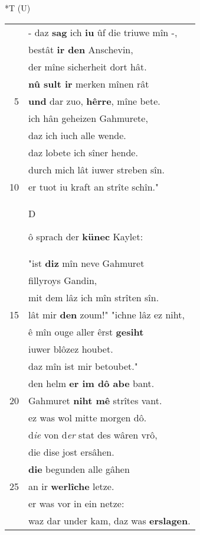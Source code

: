 \documentclass[8pt,a4paper,notitlepage]{article}
\begin{document}
\begin{table}[ht]
\begin{minipage}[t]{0.5\linewidth}
\end{minipage}
\hspace{0.5cm}
\begin{minipage}[t]{0.5\linewidth}
\small
\begin{center}*T (U)
\end{center}
\begin{tabular}{rl}
 & - daz \textbf{sag} ich \textbf{iu} ûf die triuwe mîn -,\\ 
 & bestât \textbf{ir den} Anschevin,\\ 
 & der mîne sicherheit dort hât.\\ 
 & \textbf{nû sult ir} merken mînen rât\\ 
5 & \textbf{und} dar zuo, \textbf{hêrre}, mîne bete.\\ 
 & ich hân geheizen Gahmurete,\\ 
 & daz ich iuch alle wende.\\ 
 & daz lobete ich sîner hende.\\ 
 & durch mich lât iuwer streben sîn.\\ 
10 & er tuot iu kraft an strîte schîn."\\ 
 & \begin{large}D\end{large}ô sprach der \textbf{künec} Kaylet:\\ 
 & "ist \textbf{diz} mîn neve Gahmuret\\ 
 & fillyroys Gandin,\\ 
 & mit dem lâz ich mîn strîten sîn.\\ 
15 & lât mir \textbf{den} zoum!" "ichne lâz ez niht,\\ 
 & ê mîn ouge aller êrst \textbf{gesiht}\\ 
 & iuwer blôzez houbet.\\ 
 & daz mîn ist mir betoubet."\\ 
 & den helm \textbf{er im dô abe} bant.\\ 
20 & Gahmuret \textbf{niht mê} strîtes vant.\\ 
 & ez was wol mitte morgen dô.\\ 
 & d\textit{ie} von d\textit{er} stat des wâren vrô,\\ 
 & die dise jost ersâhen.\\ 
 & \textbf{die} begunden alle gâhen\\ 
25 & an ir \textbf{werlîche} letze.\\ 
 & er was vor in ein netze:\\ 
 & waz dar under kam, daz was \textbf{erslagen}.\\ 

\end{tabular}
\end{minipage}
\end{table}
\end{document}
